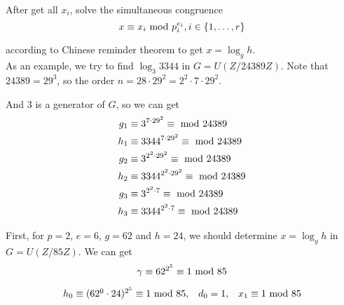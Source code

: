 \documentclass{article}
\renewcommand{\mod}{{\rm\ mod\ }}
\begin{document}
After get all $x_i$, solve the simultaneous congruence $$x\equiv x_i \mod p_i^{e_i},i\in\{1,\dots,r\}$$

according to Chinese reminder theorem to get $x=\log_gh$.\\

As an example, we try to find $\log_3 3344$ in $G=U(Z/24389Z).$ Note that $24389=29^3$, so the order $n=28\cdot29^2=2^2\cdot7\cdot29^2$.

And 3 is a generator of $G$, so we can get 
\begin{align*}
g_1 &\equiv 3^{7\cdot29^2}\equiv  \mod 24389\\
h_1 &\equiv 3344^{7\cdot29^2}\equiv  \mod 24389\\
g_2 &\equiv 3^{2^2\cdot29^2}\equiv  \mod 24389\\
h_2 &\equiv 3344^{2^2\cdot29^2}\equiv  \mod 24389 \\
g_3 &\equiv 3^{2^2\cdot7}\equiv  \mod 24389\\
h_3 &\equiv 3344^{2^2\cdot7}\equiv  \mod 24389
\end{align*}

First, for $p=2$, $e=6$, $g=62$ and $h=24$, we should determine $x=\log_gh$ in $G=U(Z/85Z)$. We can get
$$\gamma\equiv 62^{2^5} \equiv 1 \mod 85$$

$$
\begin{array}{ccc}
h_0 \equiv (62^{0}\cdot 24)^{2^5} \equiv 1 \mod 85, & d_0=1, & x_1\equiv 1 \mod 85 \\
\end{array}
$$

$$$$
$$$$
\end{document}
